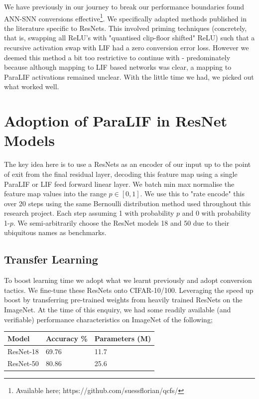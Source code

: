 \documentclass[conference]{IEEEtran}
\begin{document}
\pagebreak

We have previously in our journey to break our performance boundaries found ANN-SNN conversions effective\footnote{Available here; https://github.com/suessflorian/qcfs/}. We specifically adapted methods published in the literature specific to ResNets. This involved priming techniques (concretely, that is, swapping all ReLU's with "quantised clip-floor shifted" ReLU) such that a recursive activation swap with LIF had a zero conversion error loss. However we deemed this method a bit too restrictive to continue with - predominately because although mapping to LIF based networks was clear, a mapping to ParaLIF activations remained unclear. With the little time we had, we picked out what worked well.

\section{Adoption of ParaLIF in ResNet Models}
The key idea here is to use a ResNets as an encoder of our input up to the point of exit from the final residual layer, decoding this feature map using a single ParaLIF or LIF feed forward linear layer. We batch min max normalise the feature map values into the range $p \in [0,1]$. We use this to "rate encode" this over 20 steps using the same Bernoulli distribution method used throughout this research project. Each step assuming 1 with probability $p$ and 0 with probability 1-$p$. We semi-arbitrarily choose the ResNet models 18 and 50 due to their ubiquitous names as benchmarks.

\subsection{Transfer Learning}
To boost learning time we adopt what we learnt previously and adopt conversion tactics. We fine-tune these ResNets onto CIFAR-10/100. Leveraging the speed up boost by transferring pre-trained weights from heavily trained ResNets on the ImageNet. At the time of this enquiry, we had some readily available (and verifiable) performance characteristics on ImageNet of the following;

\vspace{0.5cm}
\begin{table}[ht]
\centering
\begin{tabular}{ l l l }
  \toprule
  Model & \multicolumn{1}{c}{Accuracy \%} & \multicolumn{1}{c}{Parameters (M)} \\
  \midrule
  ResNet-18 & \num{69.76} & \num{11.7} \\
  ResNet-50 & \num{80.86} & \num{25.6} \\
  \bottomrule
\end{tabular}
\end{table}
\end{document}
